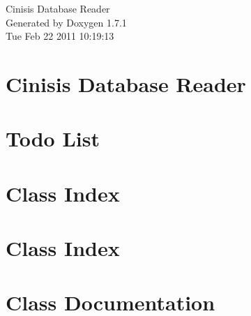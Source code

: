 \documentclass[a4paper]{book}
\begin{document}
\hypersetup{pageanchor=false}
\begin{titlepage}
\vspace*{7cm}
\begin{center}
{\Large Cinisis Database Reader }\\
\vspace*{1cm}
{\large Generated by Doxygen 1.7.1}\\
\vspace*{0.5cm}
{\small Tue Feb 22 2011 10:19:13}\\
\end{center}
\end{titlepage}
\clearemptydoublepage
{}
\tableofcontents
\clearemptydoublepage
{}
\hypersetup{pageanchor=true}
\chapter{Cinisis Database Reader}
\label{index}\hypertarget{index}{}
\chapter{Todo List}
\label{todo}
\hypertarget{todo}{}

\chapter{Class Index}

\chapter{Class Index}

\chapter{Class Documentation}





















\printindex
\end{document}
